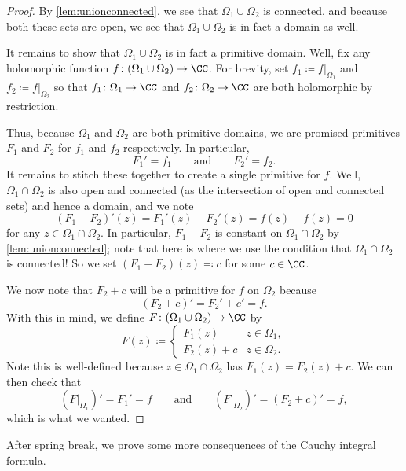 \begin{proof}
	By \autoref{lem:unionconnected}, we see that $\Omega_1\cup\Omega_2$ is connected, and because both these sets are open, we see that $\Omega_1\cup\Omega_2$ is in fact a domain as well.
	
	It remains to show that $\Omega_1\cup\Omega_2$ is in fact a primitive domain. Well, fix any holomorphic function $f\colon (\Omega_1\cup\Omega_2)\to\CC$. For brevity, set $f_1\coloneqq f|_{\Omega_1}$ and $f_2\coloneqq f|_{\Omega_2}$ so that $f_1\colon \Omega_1\to\CC$ and $f_2\colon \Omega_2\to\CC$ are both holomorphic by restriction.

	Thus, because $\Omega_1$ and $\Omega_2$ are both primitive domains, we are promised primitives $F_1$ and $F_2$ for $f_1$ and $f_2$ respectively. In particular,
	\[F_1'=f_1\qquad\text{and}\qquad F_2'=f_2.\]
	It remains to stitch these together to create a single primitive for $f$. Well, $\Omega_1\cap\Omega_2$ is also open and connected (as the intersection of open and connected sets) and hence a domain, and we note
	\[(F_1-F_2)'(z)=F_1'(z)-F_2'(z)=f(z)-f(z)=0\]
	for any $z\in\Omega_1\cap\Omega_2$. In particular, $F_1-F_2$ is constant on $\Omega_1\cap\Omega_2$ by \autoref{lem:unionconnected}; note that here is where we use the condition that $\Omega_1\cap\Omega_2$ is connected! So we set $(F_1-F_2)(z)\eqqcolon c$ for some $c\in\CC$.

	We now note that $F_2+c$ will be a primitive for $f$ on $\Omega_2$ because
	\[(F_2+c)'=F_2'+c'=f.\]
	With this in mind, we define $F\colon (\Omega_1\cup\Omega_2)\to\CC$ by
	\[F(z)\coloneqq \begin{cases}
		F_1(z) & z\in\Omega_1, \\
		F_2(z)+c & z\in\Omega_2.
	\end{cases}\]
	Note this is well-defined because $z\in\Omega_1\cap\Omega_2$ has $F_1(z)=F_2(z)+c$. We can then check that
	\[(F|_{\Omega_1})'=F_1'=f\qquad\text{and}\qquad(F|_{\Omega_2})'=(F_2+c)'=f,\]
	which is what we wanted.
\end{proof}
After spring break, we prove some more consequences of the Cauchy integral formula.